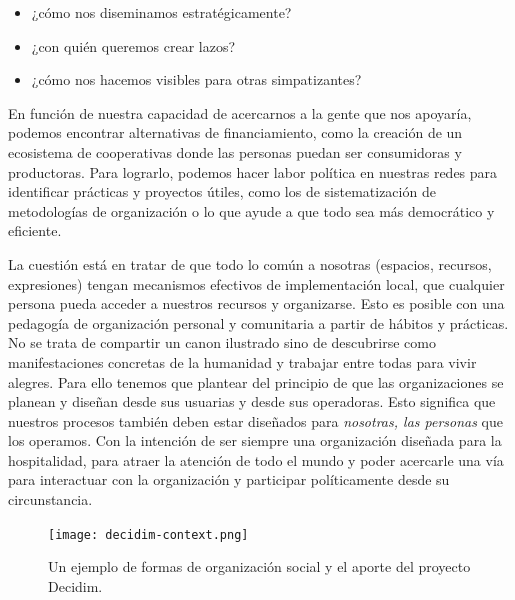\begin{itemize}
	\item ¿cómo nos diseminamos estratégicamente?
	\item ¿con quién queremos crear lazos?
	\item ¿cómo nos hacemos visibles para otras simpatizantes?
\end{itemize}

En función de nuestra capacidad de acercarnos a la gente que nos apoyaría, podemos encontrar alternativas de financiamiento, como la creación de un ecosistema de cooperativas donde las personas puedan ser consumidoras y productoras. Para lograrlo, podemos hacer labor política en nuestras redes para identificar prácticas y proyectos útiles, como los de sistematización de metodologías de organización o lo que ayude a que todo sea más democrático y eficiente.

La cuestión está en tratar de que todo lo común a nosotras (espacios, recursos, expresiones) tengan mecanismos efectivos de implementación local, que cualquier persona pueda acceder a nuestros recursos y organizarse. Esto es posible con una pedagogía de organización personal y comunitaria a partir de hábitos y prácticas. No se trata de compartir un canon ilustrado sino de descubrirse como manifestaciones concretas de la humanidad y trabajar entre todas para vivir alegres. Para ello tenemos que plantear del principio de que las organizaciones se planean y diseñan desde sus usuarias y desde sus operadoras. Esto significa que nuestros procesos también deben estar diseñados para \emph{nosotras, las personas} que los operamos. Con la intención de ser siempre una organización diseñada para la hospitalidad, para atraer la atención de todo el mundo y poder acercarle una vía para interactuar con la organización y participar políticamente desde su circunstancia.

\begin{figure}[htbp]
	\centering
	\texttt{[image: decidim-context.png]}
	\caption[Proyecto Decidim.]{Un ejemplo de formas de organización social y el aporte del proyecto Decidim.}
	\label{fig:decidim}
\end{figure}

